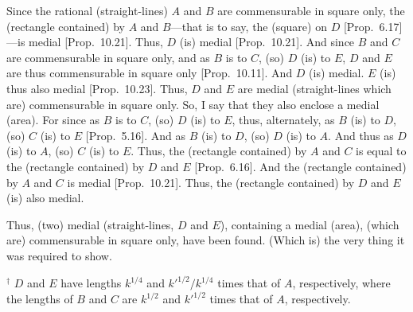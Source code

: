 \begin{Parallel}{}{}
{Since the rational (straight-lines) $A$ and $B$ are commensurable in square only, the (rectangle contained) by $A$ and $B$---that is to say, the
(square) on $D$ [Prop.~6.17]---is medial
[Prop.~10.21]. Thus, $D$ (is) medial [Prop.~10.21]. And
since $B$ and $C$ are commensurable in square only, and as $B$ is to $C$, (so) $D$ (is) to $E$, $D$ and $E$ are thus commensurable in square
only [Prop.~10.11]. And $D$ (is) medial.
$E$ (is) thus also medial [Prop.~10.23].
Thus, $D$ and $E$ are medial (straight-lines which are) commensurable
in square only. So, I say that they also enclose a medial (area). For since
as $B$ is to $C$, (so) $D$ (is) to $E$, thus, alternately, as $B$ (is) to $D$,
(so) $C$ (is) to $E$ [Prop.~5.16]. And as
$B$ (is) to $D$, (so) $D$ (is) to $A$. And thus as $D$ (is) to $A$, (so)
$C$ (is) to $E$. Thus, the (rectangle contained) by $A$ and $C$ is equal
to the (rectangle contained) by $D$ and $E$ [Prop.~6.16]. And the (rectangle contained) by 
$A$ and $C$ is medial [Prop.~10.21]. Thus, the (rectangle contained) by $D$ and $E$ (is)
also medial.

Thus, (two) medial (straight-lines, $D$ and $E$), containing a medial (area),
(which are) commensurable in square only, have been found. (Which is)
the very thing it was required to show.}
\end{Parallel}
{\footnotesize\noindent$^\dag$ $D$ and $E$ have lengths $k^{1/4}$ and ${k'}^{1/2}/{k}^{1/4}$ times that of $A$, respectively, where the lengths of $B$ and $C$ are
$k^{1/2}$ and ${k'}^{1/2}$ times that of $A$, respectively.}

